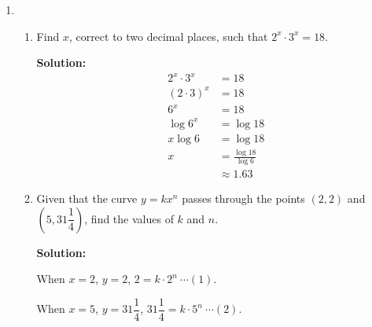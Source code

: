 \documentclass{report}
\newcommand{\sol}{\vspace{0.2cm}\textbf{Solution:}\vspace{0.2cm}}
\begin{document}
\setlength{\columnseprule}{0.4pt}
\setlength{\columnsep}{3em}

\begin{multicols*}{2}
    \begin{enumerate}[leftmargin=*]
        \item \begin{enumerate}
                  \item Find $x$, correct to two decimal places, such that $2^{x} \cdot 3^{x}=18$.

                        \sol{}
                        \begin{align*}
                            2^{x} \cdot 3^{x} & = 18                     \\
                            (2 \cdot 3)^{x}   & = 18                     \\
                            6^{x}             & = 18                     \\
                            \log 6^{x}        & = \log 18                \\
                            x \log 6          & = \log 18                \\
                            x                 & = \frac{\log 18}{\log 6} \\
                                              & \approx 1.63
                        \end{align*}

                  \item Given that the curve $y=kx^{n}$ passes through the points $(2,2)$ and
                        $\left(5,31 \dfrac{1}{4}\right)$, find the values of $k$ and $n$.

                        \sol{}

                        When $x=2$, $y=2$, $2=k \cdot 2^{n}\ \cdots (1)$.

                        When $x=5$, $y=31 \dfrac{1}{4}$, $31 \dfrac{1}{4}=k \cdot 5^{n} \ \cdots (2)$.


\end{enumerate}
\end{enumerate}
\end{multicols*}
\end{document}
